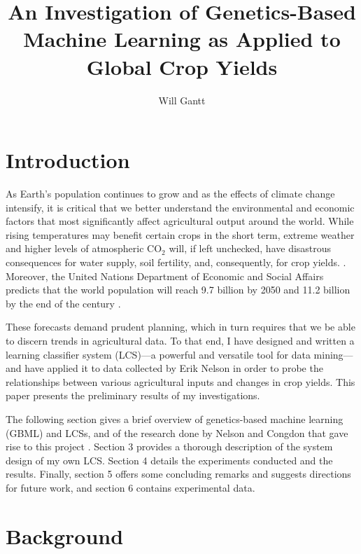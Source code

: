\documentclass[11pt]{article}
\begin{document}
\title{An Investigation of Genetics-Based Machine Learning as Applied to Global Crop Yields}
\author{Will Gantt}
\maketitle
\clearpage

\section{Introduction}

As Earth's population continues to grow and as the effects of climate change intensify, it is critical that we better understand the environmental and economic factors that most significantly affect agricultural output around the world. While rising temperatures may benefit certain crops in the short term, extreme weather and higher levels of atmospheric $\text{CO}_2$ will, if left unchecked, have disastrous consequences for water supply, soil fertility, and, consequently, for crop yields. \cite{us_epa_climate_2017}. Moreover, the United Nations Department of Economic and Social Affairs predicts that the world population will reach 9.7 billion by 2050 and 11.2 billion by the end of the century \cite{noauthor_world_2015}.

These forecasts demand prudent planning, which in turn requires that we be able to discern trends in agricultural data. To that end, I have designed and written a learning classifier system (LCS)---a powerful and versatile tool  for data mining---and have applied it to data collected by Erik Nelson in order to probe the relationships between various agricultural inputs and changes in crop yields.
This paper presents the preliminary results of my investigations.

The following section gives a brief overview of genetics-based machine learning (GBML) and LCSs, and of the research done by Nelson and Congdon that gave rise to this project \cite{nelson_measuring_2016}. Section 3 provides a thorough description of the system design of my own LCS. Section 4 details the experiments conducted and the results. Finally, section 5 offers some concluding remarks and suggests directions for future work, and section 6 contains experimental data.

\section{Background}
\end{document}
